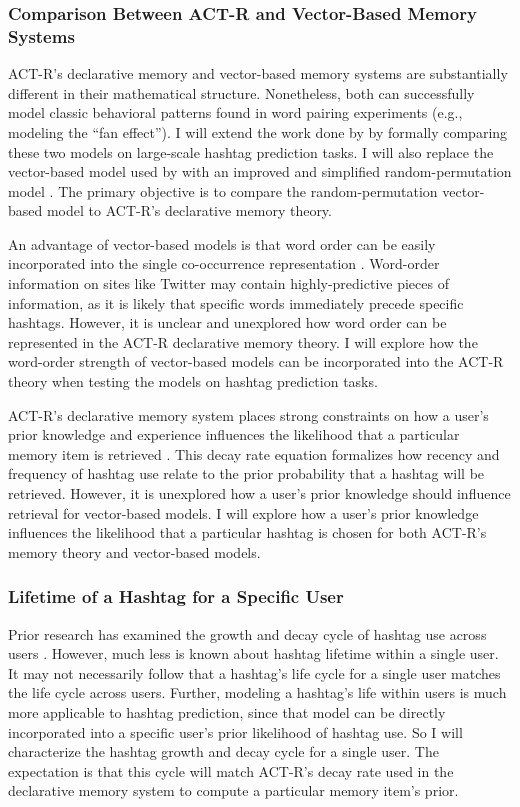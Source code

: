 \documentclass[man,floatsintext,donotrepeattitle]{apa6}
\begin{document}
\subsubsection{Comparison Between ACT-R and Vector-Based Memory Systems}

ACT-R's declarative memory and vector-based memory systems are substantially different in their mathematical structure.
Nonetheless, both can successfully model classic behavioral patterns found in word pairing experiments (e.g., \cite{Rutledge2008} modeling the ``fan effect'').
I will extend the work done by \citeauthor{Rutledge2008} by formally comparing these two models on large-scale hashtag prediction tasks.
I will also replace the vector-based model used by \citeauthor{Rutledge2008} with an improved and simplified random-permutation model \parencite{Sahlgren2008}.
The primary objective is to compare the random-permutation vector-based model to ACT-R's declarative memory theory.

An advantage of vector-based models is that word order can be easily incorporated into the single co-occurrence representation \parencite{Jones2007}.
Word-order information on sites like Twitter may contain highly-predictive pieces of information, as it is likely that specific words immediately precede specific hashtags.
However, it is unclear and unexplored how word order can be represented in the ACT-R declarative memory theory.
I will explore how the word-order strength of vector-based models can be incorporated into the ACT-R theory when testing the models on hashtag prediction tasks.

ACT-R's declarative memory system places strong constraints on how a user's prior knowledge and experience influences the likelihood that a particular memory item is retrieved \parencite{Anderson2004}.
This decay rate equation formalizes how recency and frequency of hashtag use relate to the prior probability that a hashtag will be retrieved.
However, it is unexplored how a user's prior knowledge should influence retrieval for vector-based models.
I will explore how a user's prior knowledge influences the likelihood that a particular hashtag is chosen for both ACT-R's memory theory and vector-based models.

\subsubsection{Lifetime of a Hashtag for a Specific User}

Prior research has examined the growth and decay cycle of hashtag use across users \parencite{Tsur2012}.
However, much less is known about hashtag lifetime within a single user.
It may not necessarily follow that a hashtag's life cycle for a single user matches the life cycle across users.
Further, modeling a hashtag's life within users is much more applicable to hashtag prediction, since that model can be directly incorporated into a specific user's prior likelihood of hashtag use.
So I will characterize the hashtag growth and decay cycle for a single user.
The expectation is that this cycle will match ACT-R's decay rate used in the declarative memory system to compute a particular memory item's prior.
\end{document}
